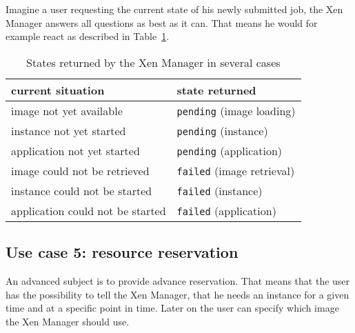 Imagine a  user requesting the current  state of his  newly submitted job,
the Xen  Manager answers all  questions as best  as it can. That  means he
would       for       example       react      as       described       in
Table~\ref{tab:monitor-cases-overview}.
\begin{table}[htbp]
  \begin{center}
    \begin{tabular*}{0.9\textwidth}{p{}|p{}}
      current situation & state returned \\ \hline\hline
      image not yet available & \texttt{pending} (image loading)\\ \hline
      instance not yet started & \texttt{pending} (instance) \\ \hline
      application not yet started & \texttt{pending} (application) \\ \hline
      image could not be retrieved & \texttt{failed} (image retrieval) \\ \hline
      instance could not be started & \texttt{failed} (instance) \\ \hline
      application could not be started & \texttt{failed} (application)
    \end{tabular*}
    \caption[States returned by the Xen Manager]{States returned by the Xen Manager in several cases}
    \label{tab:monitor-cases-overview}
  \end{center}
\end{table}


\subsection{Use case 5: resource reservation}

An advanced subject is to provide advance reservation. That means that the
user  has the  possibility  to tell  the  Xen Manager,  that  he needs  an
instance for a given  time and at a specific point in  time.  Later on the
user can specify which image the Xen Manager should use.

